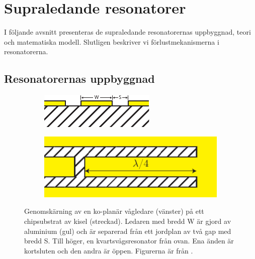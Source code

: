 \documentclass[main.tex]{subfiles}
\begin{document}
\chapter{Supraledande resonatorer}
I följande avsnitt presenteras de supraledande resonatorernas uppbyggnad, teori och matematiska modell. Slutligen beskriver vi förlustmekanismerna i resonatorerna.

\section{Resonatorernas uppbyggnad}

\begin{figure}
\centering
\begin{subfigure}{0.5\textwidth}
  \centering
  \includegraphics[width=0.9\linewidth]{figure/chipsubstrat.pdf}
\end{subfigure}%
\begin{subfigure}{.5\textwidth}
  \centering
  \includegraphics[width=0.9\linewidth]{figure/chipsubstrat2.pdf}
\end{subfigure}
\caption{Genomskärning av en ko-planär vågledare (vänster) på ett chipsubstrat av kisel (streckad). Ledaren med bredd W är gjord av aluminium (gul) och är separerad från ett jordplan av två gap med bredd S. Till höger, en kvartsvågsresonator från ovan. Ena änden är kortsluten och den andra är öppen. Figurerna är från \cite[fig. 2.1]{Boehme2016}.}
\label{fig:chipsubstrat}
\end{figure}
\end{document}
